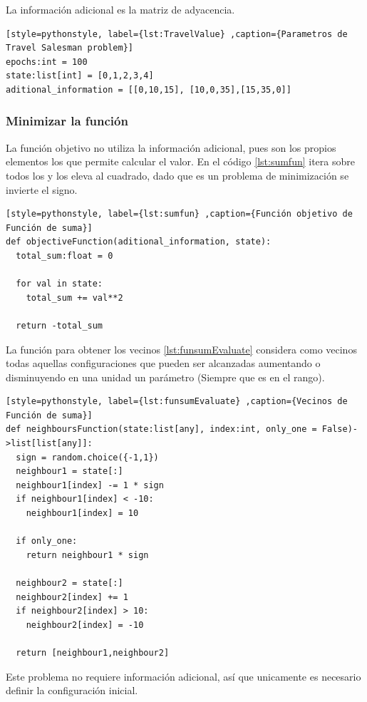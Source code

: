 \documentclass[12pt,twoside]{article}
\begin{document}
La información adicional es la matriz de adyacencia.

\begin{lstlisting}[style=pythonstyle, label={lst:TravelValue} ,caption={Parametros de Travel Salesman problem}]
epochs:int = 100
state:list[int] = [0,1,2,3,4]
aditional_information = [[0,10,15], [10,0,35],[15,35,0]] 
\end{lstlisting}

\clearpage
\subsubsection{Minimizar la función}

La función objetivo no utiliza la información adicional, pues son los propios elementos los que permite calcular el valor. En el código \ref{lst:sumfun} itera sobre todos los y los eleva al cuadrado, dado que es un problema de minimización se invierte el signo.

\begin{lstlisting}[style=pythonstyle, label={lst:sumfun} ,caption={Función objetivo de Función de suma}]
def objectiveFunction(aditional_information, state):
  total_sum:float = 0

  for val in state:
    total_sum += val**2

  return -total_sum
\end{lstlisting}

La función para obtener los vecinos \ref{lst:funsumEvaluate} considera como vecinos todas aquellas configuraciones que pueden ser alcanzadas aumentando o disminuyendo en una unidad un parámetro (Siempre que es en el rango).

\begin{lstlisting}[style=pythonstyle, label={lst:funsumEvaluate} ,caption={Vecinos de Función de suma}]
def neighboursFunction(state:list[any], index:int, only_one = False)->list[list[any]]:
  sign = random.choice({-1,1})
  neighbour1 = state[:]
  neighbour1[index] -= 1 * sign
  if neighbour1[index] < -10:
    neighbour1[index] = 10 

  if only_one:
    return neighbour1 * sign

  neighbour2 = state[:]
  neighbour2[index] += 1
  if neighbour2[index] > 10:
    neighbour2[index] = -10 

  return [neighbour1,neighbour2]
\end{lstlisting}

Este problema no requiere información adicional, así que unicamente es necesario definir la configuración inicial.
\end{document}
